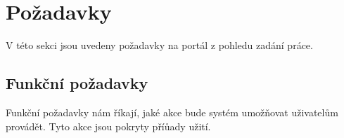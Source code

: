%

\section{Požadavky}
V této sekci jsou uvedeny požadavky na portál z pohledu zadání práce.

\subsection{Funkční požadavky}
Funkční požadavky nám říkají, jaké akce bude systém umožňovat uživatelům provádět. Tyto akce jsou pokryty příůady užití. \cite{UMLBOOK} 

